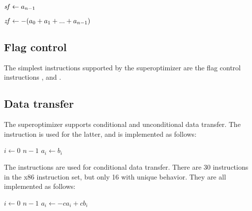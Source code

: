\documentclass[a4paper,11pt]{kth-mag}
\renewcommand{\gets}{\leftarrow}
\newcommand{\AND}{}
\newcommand{\IOR}{+}
\newcommand{\NOT}{-}
\begin{document}
\begin{codebox}
\zi $\id{sf} \gets a_{n-1}$
\end{codebox}

\begin{codebox}
\zi $\id{zf} \gets \NOT(a_0 \IOR a_1 \IOR ... \IOR a_{n-1})$
\end{codebox}

\subsection{Flag control}

The simplest instructions supported by the superoptimizer are the flag control instructions ,  and .

\subsection{Data transfer}

The superoptimizer supports conditional and unconditional data transfer.
The  instruction is used for the latter, and is implemented as follows:

\begin{codebox}
\zi \For $i \gets 0$ \To $n-1$
\zi \Do
      $a_i \gets b_i$
    \End
\end{codebox}

The  instructions are used for conditional data transfer.
There are 30  instructions in the x86 instruction set, but only 16 with unique behavior.
They are all implemented as follows:

\begin{codebox}
\zi \For $i \gets 0$ \To $n-1$
\zi \Do
      $a_i \gets \NOT c \AND a_i \IOR c \AND b_i$
    \End
\end{codebox}


\end{document}
